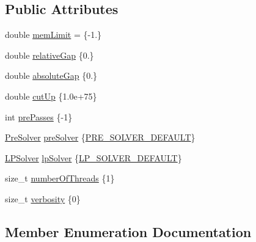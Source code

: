 \subsection*{Public Attributes}
\begin{DoxyCompactItemize}
\item 
double \hyperlink{structnifty_1_1ilp__backend_1_1IlpBackendSettings_a5f20f85b5528859b4ef8000a29fb1453}{mem\+Limit} = \{-\/1.\}
\item 
double \hyperlink{structnifty_1_1ilp__backend_1_1IlpBackendSettings_a8eed72b9ddbbc94a89197dde0d76d144}{relative\+Gap} \{0.\}
\item 
double \hyperlink{structnifty_1_1ilp__backend_1_1IlpBackendSettings_a8bc98f418844336847d868dd88e620f2}{absolute\+Gap} \{0.\}
\item 
double \hyperlink{structnifty_1_1ilp__backend_1_1IlpBackendSettings_a0bd7c55efdd7c642687b17e378da2e08}{cut\+Up} \{1.\+0e+75\}
\item 
int \hyperlink{structnifty_1_1ilp__backend_1_1IlpBackendSettings_a87cbc1618cd7cd2d88de2da14ff8c2d3}{pre\+Passes} \{-\/1\}
\item 
\hyperlink{structnifty_1_1ilp__backend_1_1IlpBackendSettings_ad16c71cc049dcb37c07f2abdda69dab4}{Pre\+Solver} \hyperlink{structnifty_1_1ilp__backend_1_1IlpBackendSettings_af1e71695a4bd0dd0921ba2db7c0208c6}{pre\+Solver} \{\hyperlink{structnifty_1_1ilp__backend_1_1IlpBackendSettings_ad16c71cc049dcb37c07f2abdda69dab4a45adcc6c0d30422e0c0a674b2fe92a37}{P\+R\+E\+\_\+\+S\+O\+L\+V\+E\+R\+\_\+\+D\+E\+F\+A\+U\+LT}\}
\item 
\hyperlink{structnifty_1_1ilp__backend_1_1IlpBackendSettings_a4b3fd0d313a8d95f9f6a3ba64802e204}{L\+P\+Solver} \hyperlink{structnifty_1_1ilp__backend_1_1IlpBackendSettings_aa0940a3d1d8399b9ed10f7e43d61e8cc}{lp\+Solver} \{\hyperlink{structnifty_1_1ilp__backend_1_1IlpBackendSettings_a4b3fd0d313a8d95f9f6a3ba64802e204a24fa810f69bf55c40d68082a2e3653f8}{L\+P\+\_\+\+S\+O\+L\+V\+E\+R\+\_\+\+D\+E\+F\+A\+U\+LT}\}
\item 
size\+\_\+t \hyperlink{structnifty_1_1ilp__backend_1_1IlpBackendSettings_ae9852b9ee86048c11366c7248ca8dbfd}{number\+Of\+Threads} \{1\}
\item 
size\+\_\+t \hyperlink{structnifty_1_1ilp__backend_1_1IlpBackendSettings_aecafa6adf4695088d0396f232bbe88ba}{verbosity} \{0\}
\end{DoxyCompactItemize}


\subsection{Member Enumeration Documentation}
\mbox{\label{structnifty_1_1ilp__backend_1_1IlpBackendSettings_a4b3fd0d313a8d95f9f6a3ba64802e204}} 
